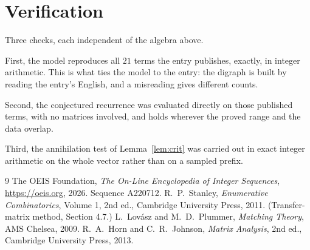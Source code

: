 \documentclass[11pt,a4paper]{article}
\theoremstyle{plain}
\theoremstyle{definition}
\begin{document}
\section{Verification}

Three checks, each independent of the algebra above.

First, the model reproduces all $21$ terms the entry publishes, exactly, in integer
arithmetic. This is what ties the model to the entry: the digraph is built by reading the
entry's English, and a misreading gives different counts.

Second, the conjectured recurrence was evaluated directly on those published terms, with no
matrices involved, and holds wherever the proved range and the data overlap.

Third, the annihilation test of Lemma~\ref{lem:crit} was carried out in exact integer
arithmetic on the whole vector rather than on a sampled prefix.

\begin{thebibliography}{9}
 The OEIS Foundation, \emph{The On-Line Encyclopedia of Integer
Sequences}, \url{https://oeis.org}, 2026. Sequence A220712.
 R.~P.~Stanley, \emph{Enumerative Combinatorics}, Volume 1, 2nd ed.,
Cambridge University Press, 2011. (Transfer-matrix method, Section 4.7.)
 L.~Lov\'asz and M.~D.~Plummer, \emph{Matching Theory}, AMS Chelsea,
2009.
 R.~A.~Horn and C.~R.~Johnson, \emph{Matrix Analysis}, 2nd ed., Cambridge
University Press, 2013.
\end{thebibliography}
\end{document}
